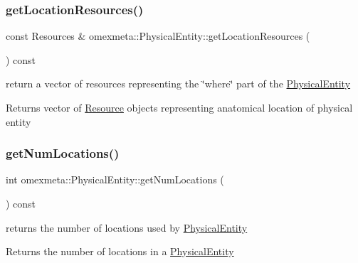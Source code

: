 \subsubsection{\texorpdfstring{get\+Location\+Resources()}{getLocationResources()}}
{\footnotesize\ttfamily const Resources \& omexmeta\+::\+Physical\+Entity\+::get\+Location\+Resources (\begin{DoxyParamCaption}{ }\end{DoxyParamCaption}) const}



return a vector of resources representing the \char`\"{}where\char`\"{} part of the \hyperlink{classomexmeta_1_1PhysicalEntity}{Physical\+Entity} 

\begin{DoxyReturn}{Returns}
vector of \hyperlink{classomexmeta_1_1Resource}{Resource} objects representing anatomical location of physical entity 
\end{DoxyReturn}
\mbox{\label{classomexmeta_1_1PhysicalEntity_a33559c90dbe3e3be1b71898ab9a5bfa4}} 
\subsubsection{\texorpdfstring{get\+Num\+Locations()}{getNumLocations()}}
{\footnotesize\ttfamily int omexmeta\+::\+Physical\+Entity\+::get\+Num\+Locations (\begin{DoxyParamCaption}{ }\end{DoxyParamCaption}) const}



returns the number of locations used by \hyperlink{classomexmeta_1_1PhysicalEntity}{Physical\+Entity} 

\begin{DoxyReturn}{Returns}
the number of locations in a \hyperlink{classomexmeta_1_1PhysicalEntity}{Physical\+Entity} 
\end{DoxyReturn}
\mbox{\label{classomexmeta_1_1PhysicalEntity_a2498e9b0b11a00200e47332c4515b1f1}} 
